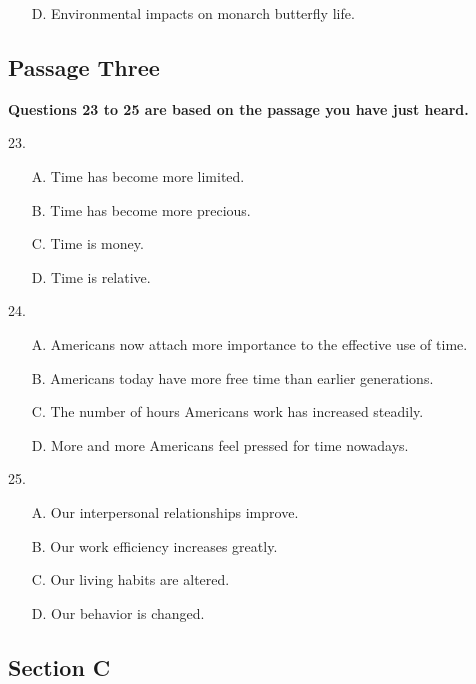 \documentclass[UTF8,11pt]{ctexart}
\begin{document}
\begin{itemize}[leftmargin=2em,itemsep=.2em,topsep=.4em]\item[D.] Environmental impacts on monarch butterfly life.
\end{itemize}

\subsection*{\textbf{Passage Three}}


\textbf{Questions 23 to 25 are based on the passage you have just heard.}


23.


\begin{itemize}[leftmargin=2em,itemsep=.2em,topsep=.4em]\item[A.] Time has become more limited.
\item[B.] Time has become more precious.
\item[C.] Time is money.
\item[D.] Time is relative.
\end{itemize}

24.


\begin{itemize}[leftmargin=2em,itemsep=.2em,topsep=.4em]\item[A.] Americans now attach more importance to the effective use of time.
\item[B.] Americans today have more free time than earlier generations.
\item[C.] The number of hours Americans work has increased steadily.
\item[D.] More and more Americans feel pressed for time nowadays.
\end{itemize}

25.


\begin{itemize}[leftmargin=2em,itemsep=.2em,topsep=.4em]\item[A.] Our interpersonal relationships improve.
\item[B.] Our work efficiency increases greatly.
\item[C.] Our living habits are altered.
\item[D.] Our behavior is changed.
\end{itemize}

\subsection*{\textbf{Section C}}
\end{document}
